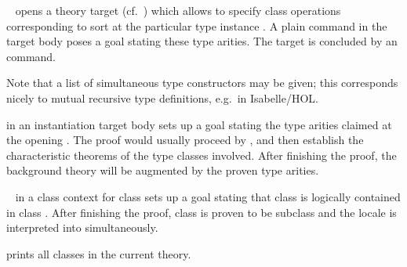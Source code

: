 \begin{isabellebody}
\begin{isamarkuptext}
\begin{description}
  \item \hyperlink{command.instantiation}{\mbox{}}~ opens a theory target (cf.\ ) which
  allows to specify class operations  corresponding
  to sort  at the particular type instance .  A plain \hyperlink{command.instance}{\mbox{}} command in the
  target body poses a goal stating these type arities.  The target is
  concluded by an \hyperlink{command.local.end}{\mbox{}} command.

  Note that a list of simultaneous type constructors may be given;
  this corresponds nicely to mutual recursive type definitions, e.g.\
  in Isabelle/HOL.

  \item \hyperlink{command.instance}{\mbox{}} in an instantiation target body sets
  up a goal stating the type arities claimed at the opening \hyperlink{command.instantiation}{\mbox{}}.  The proof would usually proceed by \hyperlink{method.intro-classes}{\mbox{}}, and then establish the characteristic theorems of
  the type classes involved.  After finishing the proof, the
  background theory will be augmented by the proven type arities.

  \item \hyperlink{command.subclass}{\mbox{}}~ in a class context for class
   sets up a goal stating that class  is logically
  contained in class .  After finishing the proof, class
  \isa{d} is proven to be subclass  and the locale \isa{c} is interpreted into  simultaneously.

  \item \hyperlink{command.print-classes}{\mbox{}} prints all classes in the current
  theory.


\end{description}
\end{isamarkuptext}
\end{isabellebody}
